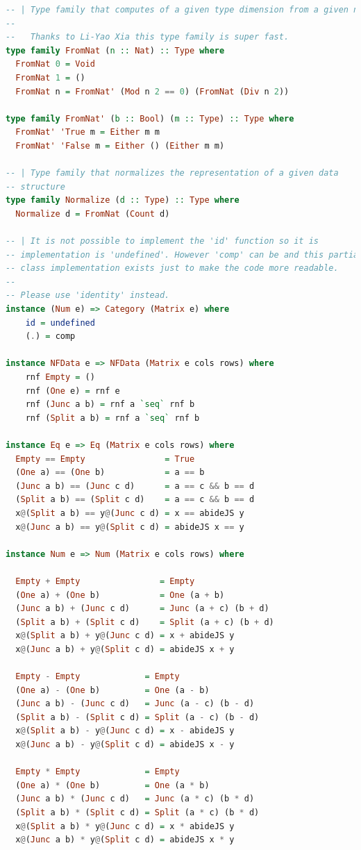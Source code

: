 \documentclass[
  oneside,
  11pt, a4paper,
  footinclude=true,
  headinclude=true,
  cleardoublepage=empty
]{scrbook}
\theoremstyle{definition}
\theoremstyle{definition}
\begin{document}
\begin{lstlisting}[language=Haskell, caption={Matrix.Internal},captionpos=b]
-- | Type family that computes of a given type dimension from a given natural
--
--   Thanks to Li-Yao Xia this type family is super fast.
type family FromNat (n :: Nat) :: Type where
  FromNat 0 = Void
  FromNat 1 = ()
  FromNat n = FromNat' (Mod n 2 == 0) (FromNat (Div n 2))

type family FromNat' (b :: Bool) (m :: Type) :: Type where
  FromNat' 'True m = Either m m
  FromNat' 'False m = Either () (Either m m)

-- | Type family that normalizes the representation of a given data
-- structure
type family Normalize (d :: Type) :: Type where
  Normalize d = FromNat (Count d)

-- | It is not possible to implement the 'id' function so it is
-- implementation is 'undefined'. However 'comp' can be and this partial
-- class implementation exists just to make the code more readable.
--
-- Please use 'identity' instead.
instance (Num e) => Category (Matrix e) where
    id = undefined
    (.) = comp

instance NFData e => NFData (Matrix e cols rows) where
    rnf Empty = ()
    rnf (One e) = rnf e
    rnf (Junc a b) = rnf a `seq` rnf b
    rnf (Split a b) = rnf a `seq` rnf b

instance Eq e => Eq (Matrix e cols rows) where
  Empty == Empty                = True
  (One a) == (One b)            = a == b
  (Junc a b) == (Junc c d)      = a == c && b == d
  (Split a b) == (Split c d)    = a == c && b == d
  x@(Split a b) == y@(Junc c d) = x == abideJS y
  x@(Junc a b) == y@(Split c d) = abideJS x == y

instance Num e => Num (Matrix e cols rows) where

  Empty + Empty                = Empty
  (One a) + (One b)            = One (a + b)
  (Junc a b) + (Junc c d)      = Junc (a + c) (b + d)
  (Split a b) + (Split c d)    = Split (a + c) (b + d)
  x@(Split a b) + y@(Junc c d) = x + abideJS y
  x@(Junc a b) + y@(Split c d) = abideJS x + y

  Empty - Empty             = Empty
  (One a) - (One b)         = One (a - b)
  (Junc a b) - (Junc c d)   = Junc (a - c) (b - d)
  (Split a b) - (Split c d) = Split (a - c) (b - d)
  x@(Split a b) - y@(Junc c d) = x - abideJS y
  x@(Junc a b) - y@(Split c d) = abideJS x - y

  Empty * Empty             = Empty
  (One a) * (One b)         = One (a * b)
  (Junc a b) * (Junc c d)   = Junc (a * c) (b * d)
  (Split a b) * (Split c d) = Split (a * c) (b * d)
  x@(Split a b) * y@(Junc c d) = x * abideJS y
  x@(Junc a b) * y@(Split c d) = abideJS x * y


\end{lstlisting}
\end{document}

